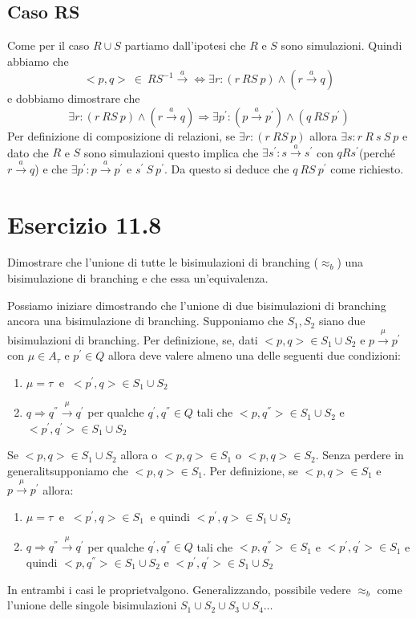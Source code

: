 		\subsection{Caso RS}
		
		Come per il caso $R\cup S$ partiamo dall'ipotesi che $R$ e $S$ sono simulazioni. Quindi abbiamo che $$<p,q>\ \in \ RS^{-1} \xrightarrow{a}  \Leftrightarrow \exists r: (r \ RS \ p) \land (r \xrightarrow{a} q)$$
		e dobbiamo dimostrare che
		$$\exists r: (r \ RS \ p) \land (r \xrightarrow{a} q) \Rightarrow \exists p^{'}: (p \xrightarrow{a} p^{'}) \land (q \ RS \ p^{'})$$
		Per definizione di composizione di relazioni, se $\exists r: (r \ RS \ p)$ allora $\exists s: r\ R\ s\ S\ p$ e dato che $R$ e $S$ sono simulazioni questo implica che $\exists s^{'}: s \xrightarrow{a} s^{'}$ con $q R s^{'}$(perch\'e $r \xrightarrow{a}q$) e che $\exists p^{'}: p \xrightarrow{a} p^{'}$ e $s^{'}\ S\ p^{'}$. Da questo si deduce che $q\ RS\ p^{'}$ come richiesto.
			
		\newpage
		
	\section{Esercizio 11.8}
		Dimostrare che l'unione di tutte le bisimulazioni di branching ($\approx_{b}$) \eacc una
		bisimulazione di branching e che essa \eacc un'equivalenza.
		
		\sectionline
		
		Possiamo iniziare dimostrando che l'unione di due bisimulazioni di branching \eacc ancora una bisimulazione di branching. Supponiamo che $S_{1},S_{2}$ siano due bisimulazioni di branching. Per definizione, se, dati $<p,q>\in S_{1}\cup S_{2}$ e $p \xrightarrow{\mu}p^{'}$ con $\mu \in A_{\tau}$ e $p^{'}\in Q$ allora deve valere almeno una delle seguenti due condizioni:
		\begin{enumerate}
			\item $\mu = \tau\ $ e $\ <p^{'},q>\in S_{1}\cup S_{2}$
			\item $q \Rightarrow q^{''}\xrightarrow{\mu}q^{'}$ per qualche $q^{'},q^{''}\in Q$ tali che $<p,q^{''}>\in S_{1}\cup S_{2}$ e $<p^{'},q^{'}>\in S_{1}\cup S_{2}$
		\end{enumerate}
		
		Se $<p,q>\in S_{1}\cup S_{2}$ allora o $<p,q>\in S_{1}$ o $<p,q>\in S_{2}$. Senza perdere in generalit\aacc supponiamo che $<p,q>\in S_{1}$. Per definizione, se $<p,q>\in S_{1}$ e $p \xrightarrow{\mu}p^{'}$ allora:
		\begin{enumerate}
			\item $\mu = \tau\ $ e $\ <p^{'},q>\in S_{1}\ $ e quindi $<p^{'},q>\in S_{1}\cup S_{2}$
			\item $q \Rightarrow q^{''}\xrightarrow{\mu}q^{'}$ per qualche $q^{'},q^{''}\in Q$ tali che $<p,q^{''}>\in S_{1}$ e $<p^{'},q^{'}>\in S_{1}$ e quindi $<p,q^{''}>\in S_{1}\cup S_{2}$ e $<p^{'},q^{'}>\in S_{1}\cup S_{2}$
		\end{enumerate} 
		In entrambi i casi le propriet\aacc valgono. Generalizzando, \eacc possibile vedere $\approx_{b}$ come l'unione delle singole bisimulazioni $S_{1}\cup S_{2}\cup S_{3}\cup S_{4}\dots$
		
